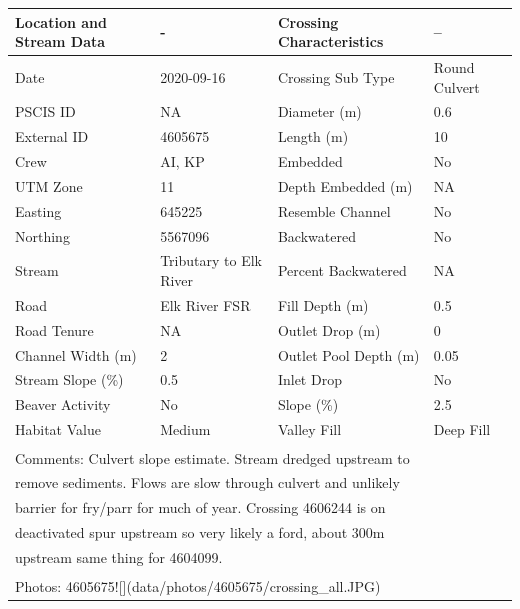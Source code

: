 \documentclass[
]{book}
\begin{document}
\begin{tabular}{l|l|l|l}
\hline
Location and Stream Data & - & Crossing Characteristics & --\\
\hline
Date & 2020-09-16 & Crossing Sub Type & Round Culvert\\
\hline
PSCIS ID & NA & Diameter (m) & 0.6\\
\hline
External ID & 4605675 & Length (m) & 10\\
\hline
Crew & AI, KP & Embedded & No\\
\hline
UTM Zone & 11 & Depth Embedded (m) & NA\\
\hline
Easting & 645225 & Resemble Channel & No\\
\hline
Northing & 5567096 & Backwatered & No\\
\hline
Stream & Tributary to Elk River & Percent Backwatered & NA\\
\hline
Road & Elk River FSR & Fill Depth (m) & 0.5\\
\hline
Road Tenure & NA & Outlet Drop (m) & 0\\
\hline
Channel Width (m) & 2 & Outlet Pool Depth (m) & 0.05\\
\hline
Stream Slope (\%) & 0.5 & Inlet Drop & No\\
\hline
Beaver Activity & No & Slope (\%) & 2.5\\
\hline
Habitat Value & Medium & Valley Fill & Deep Fill\\
\hline
\multicolumn{4}{l}{\textsuperscript{} Comments: Culvert slope estimate. Stream dredged upstream to}\\
\multicolumn{4}{l}{remove sediments. Flows are slow through culvert and unlikely}\\
\multicolumn{4}{l}{barrier for fry/parr for much of year. Crossing 4606244 is on}\\
\multicolumn{4}{l}{deactivated spur upstream so very likely a ford, about 300m}\\
\multicolumn{4}{l}{upstream same thing for 4604099.}\\
\multicolumn{4}{l}{\textsuperscript{} Photos: 4605675![](data/photos/4605675/crossing\_all.JPG)}\\
\end{tabular}
\end{document}
